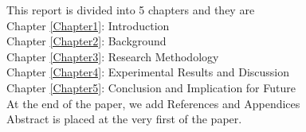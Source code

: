 This report is divided into 5 chapters and they are\\ 
Chapter \ref{Chapter1}: {Introduction} \\
 Chapter \ref{Chapter2}: {Background} \\ 
 Chapter \ref{Chapter3}: {Research Methodology} \\ 
 Chapter \ref{Chapter4}: {Experimental Results and Discussion}\\
  Chapter \ref{Chapter5}: {Conclusion and Implication for Future}\\
At the end of the paper, we add References and Appendices  \\ Abstract is placed at the very first of the paper.
\\\\
